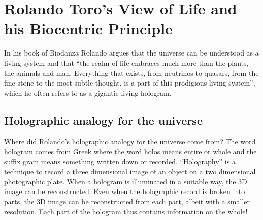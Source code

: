 \documentclass[
  11pt,
]{book}
\begin{document}
\hypertarget{rolando-toros-view-of-life-and-his-biocentric-principle}{%
\section{Rolando Toro's View of Life and his Biocentric Principle}\label{rolando-toros-view-of-life-and-his-biocentric-principle}}

In his book of Biodanza Rolando argues that the universe can be understood as a living system and that ``the realm of life embraces much more than the plants, the animals and man. Everything that exists, from neutrinos to quasars, from the fine stone to the most subtle thought, is a part of this prodigious living system'', which he often refers to as a gigantic living hologram.

\hypertarget{holographic-analogy-for-the-universe}{%
\subsection{Holographic analogy for the universe}\label{holographic-analogy-for-the-universe}}

Where did Rolando's holographic analogy for the universe come from?
The word hologram comes from Greek where the word holos means entire or whole and the suffix gram means something written down or recorded.
``Holography'' is a technique to record a three dimensional image of an object on a two dimensional photographic plate. When a hologram is illuminated in a suitable way, the 3D image can be reconstructed. Even when the holographic record is broken into parts, the 3D image can be reconstructed from each part, albeit with a smaller resolution. Each part of the hologram thus contains information on the whole!
\end{document}
